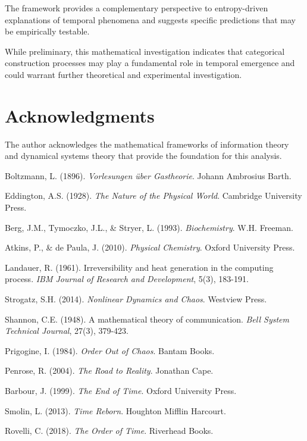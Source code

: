 \documentclass[12pt,a4paper]{article}
\theoremstyle{remark}
\begin{document}
The framework provides a complementary perspective to entropy-driven explanations of temporal phenomena and suggests specific predictions that may be empirically testable.

While preliminary, this mathematical investigation indicates that categorical construction processes may play a fundamental role in temporal emergence and could warrant further theoretical and experimental investigation.

\section*{Acknowledgments}

The author acknowledges the mathematical frameworks of information theory and dynamical systems theory that provide the foundation for this analysis.


\begin{thebibliography}{99}

Boltzmann, L. (1896). \textit{Vorlesungen über Gastheorie}. Johann Ambrosius Barth.

Eddington, A.S. (1928). \textit{The Nature of the Physical World}. Cambridge University Press.

Berg, J.M., Tymoczko, J.L., \& Stryer, L. (1993). \textit{Biochemistry}. W.H. Freeman.

Atkins, P., \& de Paula, J. (2010). \textit{Physical Chemistry}. Oxford University Press.

Landauer, R. (1961). Irreversibility and heat generation in the computing process. \textit{IBM Journal of Research and Development}, 5(3), 183-191.

Strogatz, S.H. (2014). \textit{Nonlinear Dynamics and Chaos}. Westview Press.

Shannon, C.E. (1948). A mathematical theory of communication. \textit{Bell System Technical Journal}, 27(3), 379-423.

Prigogine, I. (1984). \textit{Order Out of Chaos}. Bantam Books.

Penrose, R. (2004). \textit{The Road to Reality}. Jonathan Cape.

Barbour, J. (1999). \textit{The End of Time}. Oxford University Press.

Smolin, L. (2013). \textit{Time Reborn}. Houghton Mifflin Harcourt.

Rovelli, C. (2018). \textit{The Order of Time}. Riverhead Books.

\end{thebibliography}
\end{document}
